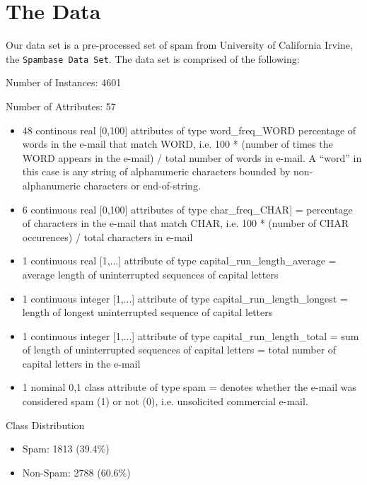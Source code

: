 \documentclass[10pt,letterpaper,onecolumn,draftclsnofoot]{IEEEtran}
\begin{document}
\section{The Data}
Our data set is a pre-processed set of spam from University of California Irvine,
the \texttt{Spambase Data Set}.\cite{spambase} The data set is comprised of the
following:
\begin{description}
  \item Number of Instances: 4601
  \item Number of Attributes: 57
  \begin{itemize}
    \item 48 continous real [0,100] attributes of type word\_freq\_WORD
    percentage of words in the e-mail that match WORD, i.e. 100 * (number of
    times the WORD appears in the e-mail) / total number of words in e-mail. A
    ``word'' in this case is any string of alphanumeric characters bounded by
    non-alphanumeric characters or end-of-string.

    \item 6 continuous real [0,100] attributes of type char\_freq\_CHAR]
    = percentage of characters in the e-mail that match CHAR, i.e. 100 *
    (number of CHAR occurences) / total characters in e-mail

    \item 1 continuous real [1,...] attribute of type capital\_run\_length\_average
    = average length of uninterrupted sequences of capital letters

    \item 1 continuous integer [1,...] attribute of type capital\_run\_length\_longest
    = length of longest uninterrupted sequence of capital letters

    \item 1 continuous integer [1,...] attribute of type capital\_run\_length\_total
    = sum of length of uninterrupted sequences of capital letters
    = total number of capital letters in the e-mail

    \item 1 nominal {0,1} class attribute of type spam
    = denotes whether the e-mail was considered spam (1) or not (0), i.e.
    unsolicited commercial e-mail.
  \end{itemize}
  \item Class Distribution
  \begin{itemize}
      \item Spam: 1813 (39.4\%)
      \item Non-Spam: 2788 (60.6\%)
  \end{itemize}
\end{description}
\end{document}
